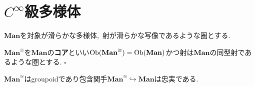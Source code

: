 \section{$C^\infty$級多様体}

\begin{definition}
$\mathbf{Man}$を対象が滑らかな多様体,\ 射が滑らかな写像であるような圏とする.

$\mathbf{Man}^{\cong}$を$\mathbf{Man}$の\textbf{コア}といい$\textrm{Ob}(\mathbf{Man}^{\cong}) = \textrm{Ob}(\mathbf{Man})$かつ射は$\mathbf{Man}$の同型射であるような圏とする.
\hfill $\square$
\end{definition}

$\mathbf{Man}^{\cong}$はgroupoidであり包含関手$\mathbf{Man}^{\cong} \hookrightarrow \mathbf{Man}$は忠実である.